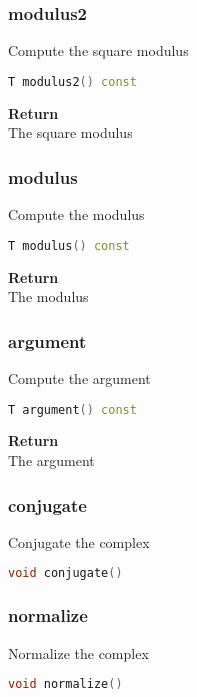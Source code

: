 \subsubsection{modulus2}
\begin{mdframed}
Compute the square modulus
\begin{lstlisting}[language=C++]
T modulus2() const
\end{lstlisting}
\textbf{Return} \\ 
The square modulus\\ 
\end{mdframed}

\subsubsection{modulus}
\begin{mdframed}
Compute the modulus
\begin{lstlisting}[language=C++]
T modulus() const
\end{lstlisting}
\textbf{Return} \\ 
The modulus\\ 
\end{mdframed}

\subsubsection{argument}
\begin{mdframed}
Compute the argument
\begin{lstlisting}[language=C++]
T argument() const
\end{lstlisting}
\textbf{Return} \\ 
The argument\\ 
\end{mdframed}

\subsubsection{conjugate}
\begin{mdframed}
Conjugate the complex
\begin{lstlisting}[language=C++]
void conjugate()
\end{lstlisting}
\end{mdframed}

\subsubsection{normalize}
\begin{mdframed}
Normalize the complex
\begin{lstlisting}[language=C++]
void normalize()
\end{lstlisting}
\end{mdframed}

